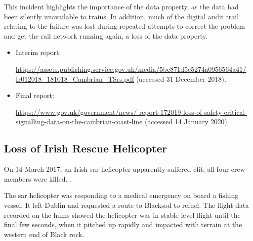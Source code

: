 This incident highlights the importance of the  \gls{data property}, as the data had been silently unavailable to trains. In addition, much of the digital audit trail relating to the failure was lost during repeated attempts to correct the problem and get the rail network running again, a loss of the  \gls{data property}.

\begin{samepage}
\begin{itemize}
\item Interim report: \raggedright{\href{https://assets.publishing.service.gov.uk/media/5bc871d5e5274a0956564a41/Ir012018_181018_Cambrian_TSrs.pdf}{https://assets.publishing.service.gov.uk/media/5bc871d5e5274a0956564a41/ Ir012018\_181018\_Cambrian\_TSrs.pdf} (accessed 31 December 2018).}
\item
  Final report: \raggedright{\href{https://www.gov.uk/government/news/report-172019-loss-of-safety-critical-signalling-data-on-the-cambrian-coast-line}{https://www.gov.uk/government/news/ report-172019-loss-of-safety-critical-signalling-data-on-the-cambrian-coast-line} (accessed 14 January 2020).}
\end{itemize}
\end{samepage}

\subsection{Loss of Irish Rescue Helicopter} \label{bkm:incacc:irishsar}
On 14 March 2017, an Irish \gls{sar} helicopter apparently suffered \gls{cfit}; all four crew members were killed. .

The \gls{sar} helicopter was responding to a medical emergency on board a fishing vessel. It left Dublin and requested a route to Blacksod to refuel. The flight data recorded on the \gls{hums} showed the helicopter was in stable level flight until the final few seconds, when it pitched up rapidly and impacted with terrain at the western end of Black rock.

